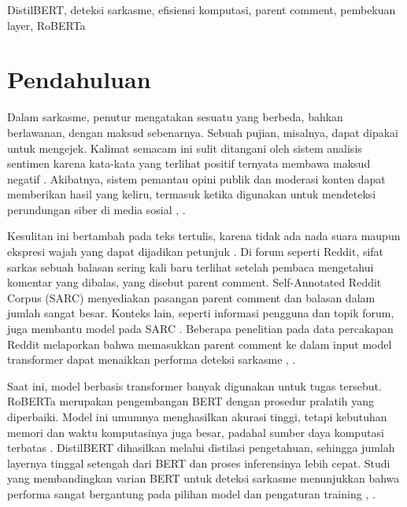 \documentclass[conference]{IEEEtran}
\begin{document}
\begin{IEEEkeywords}
DistilBERT, deteksi sarkasme, efisiensi komputasi, parent comment, pembekuan layer, RoBERTa
\end{IEEEkeywords}

\section{Pendahuluan}
Dalam sarkasme, penutur mengatakan sesuatu yang berbeda, bahkan berlawanan, dengan maksud sebenarnya. Sebuah pujian, misalnya, dapat dipakai untuk mengejek. Kalimat semacam ini sulit ditangani oleh sistem analisis sentimen karena kata-kata yang terlihat positif ternyata membawa maksud negatif \cite{prakash2025sarcasm}. Akibatnya, sistem pemantau opini publik dan moderasi konten dapat memberikan hasil yang keliru, termasuk ketika digunakan untuk mendeteksi perundungan siber di media sosial \cite{dhumpati2025sarcasm}, \cite{grover2026emoji}.

Kesulitan ini bertambah pada teks tertulis, karena tidak ada nada suara maupun ekspresi wajah yang dapat dijadikan petunjuk \cite{jimenez2026bert}. Di forum seperti Reddit, sifat sarkas sebuah balasan sering kali baru terlihat setelah pembaca mengetahui komentar yang dibalas, yang disebut parent comment. Self-Annotated Reddit Corpus (SARC) \cite{khodak2018sarc} menyediakan pasangan parent comment dan balasan dalam jumlah sangat besar. Konteks lain, seperti informasi pengguna dan topik forum, juga membantu model pada SARC \cite{hao2023enhanced}. Beberapa penelitian pada data percakapan Reddit melaporkan bahwa memasukkan parent comment ke dalam input model transformer dapat menaikkan performa deteksi sarkasme \cite{ataeii2020transformers}, \cite{dubey2025unpacking}.

Saat ini, model berbasis transformer banyak digunakan untuk tugas tersebut. RoBERTa \cite{liu2019roberta} merupakan pengembangan BERT dengan prosedur pralatih yang diperbaiki. Model ini umumnya menghasilkan akurasi tinggi, tetapi kebutuhan memori dan waktu komputasinya juga besar, padahal sumber daya komputasi terbatas \cite{treviso2023efficient}. DistilBERT \cite{sanh2019distilbert} dihasilkan melalui distilasi pengetahuan, sehingga jumlah layernya tinggal setengah dari BERT dan proses inferensinya lebih cepat. Studi yang membandingkan varian BERT untuk deteksi sarkasme menunjukkan bahwa performa sangat bergantung pada pilihan model dan pengaturan training \cite{jimenez2026bert}, \cite{ullah2026advanced}.
\end{document}
